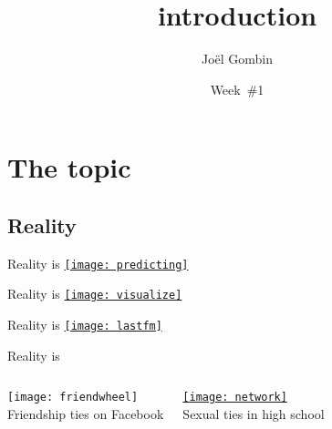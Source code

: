 \documentclass[t]{beamer}
\title{introduction}
\author{Joël Gombin}
\date{Week~\#1}
\begin{document}
	
	\section{The topic}
	
  \subsection{Reality}
  
  \begin{frame}[t]{Reality is }
    \href{http://articles.latimes.com/2010/aug/21/local/la-me-predictcrime-20100427-1}{\texttt{[image: predicting]}}
  \end{frame}
    
  \begin{frame}[t]{Reality is }
    \href{http://www.bricoleurbanism.org/whimsicality/urban-fabric-form-comparison/}{\texttt{[image: visualize]}}
  \end{frame}
  
  \begin{frame}[t]{Reality is }
    \href{http://www.last.fm/user/phnk1/library}{\texttt{[image: lastfm]}}
  \end{frame}

  \begin{frame}[c]{Reality is }

    \begin{columns}[T]


      \begin{center}
        \texttt{[image: friendwheel]}\\
        \vspace{0.74cm}
        Friendship ties on Facebook
      \end{center}


      \begin{center}
        \href{http://www.sociology.columbia.edu/pdf-files/bearmanarticle.pdf}{\texttt{[image: network]}}\\
        \vspace{0.7cm}
        Sexual ties in high school
      \end{center}

    \end{columns}

  \end{frame}
  
\end{document}
